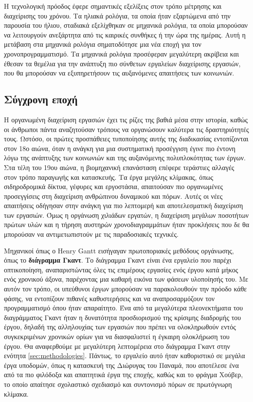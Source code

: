             Η τεχνολογική πρόοδος έφερε σημαντικές εξελίξεις στον τρόπο μέτρησης και διαχείρισης του χρόνου. Τα ηλιακά ρολόγια, τα οποία ήταν εξαρτώμενα από την παρουσία του ήλιου, σταδιακά εξελίχθηκαν σε μηχανικά ρολόγια, τα οποία μπορούσαν να λειτουργούν ανεξάρτητα από τις καιρικές συνθήκες ή την ώρα της ημέρας. Αυτή η μετάβαση στα μηχανικά ρολόγια σηματοδότησε μια νέα εποχή για τον χρονοπρογραμματισμό. Τα μηχανικά ρολόγια προσέφεραν μεγαλύτερη ακρίβεια και έθεσαν τα θεμέλια για την ανάπτυξη πιο σύνθετων εργαλείων διαχείρισης εργασιών, που θα μπορούσαν να εξυπηρετήσουν τις αυξανόμενες απαιτήσεις των κοινωνιών.

        \subsection{Σύγχρονη εποχή}
            Η οργανωμένη διαχείριση εργασιών έχει τις ρίζες της βαθιά μέσα στην ιστορία, καθώς οι άνθρωποι πάντα αναζητούσαν τρόπους να οργανώσουν καλύτερα τις δραστηριότητές τους. Ωστόσο, οι πρώτες προσπάθειες τυποποίησης αυτής της διαδικασίας εντοπίζονται στον 18ο αιώνα, όταν η ανάγκη για μια συστηματική προσέγγιση έγινε πιο έντονη λόγω της ανάπτυξης των κοινωνιών και της αυξανόμενης πολυπλοκότητας των έργων. Στα τέλη του 19ου αιώνα, η βιομηχανική επανάσταση επέφερε τεράστιες αλλαγές στον τρόπο παραγωγής και κατασκευής. Τα έργα μεγάλης κλίμακας, όπως σιδηροδρομικά δίκτυα, γέφυρες και εργοστάσια, απαιτούσαν πιο οργανωμένες προσεγγίσεις στη διαχείριση ανθρώπινου δυναμικού και πόρων. Αυτές οι νέες απαιτήσεις οδήγησαν στην ανάγκη για πιο λεπτομερή και αποτελεσματική διαχείριση των εργασιών. Όμως η οργάνωση χιλιάδων εργατών, η διαχείριση μεγάλων ποσοτήτων πρώτων υλών και η τήρηση αυστηρών χρονοδιαγραμμάτων ήταν προκλήσεις που δε θα μπορούσαν να αντιμετωπιστούν με τις παραδοσιακές τεχνικές.

            Μηχανικοί όπως ο Henry Gantt εισήγαγαν πρωτοποριακές μεθόδους οργάνωσης, όπως το \textbf{διάγραμμα Γκαντ}. Το διάγραμμα Γκαντ είναι ένα εργαλείο που παρέχι οπτικοποίηση, αναπαριστώντας όλες τις επιμέρους εργασίες ενός έργου κατά μήκος ενός χρονικού άξονα, παρέχοντας μια καθαρή εικόνα των φάσεων υλοποίησής του. Με αυτόν τον τρόπο, οι υπεύθυνοι έργων μπορούσαν να παρακολουθούν την πρόοδο κάθε φάσης, να εντοπίζουν πιθανές καθυστερήσεις και να αναπροσαρμόζουν τον προγραμματισμό όπου ήταν απαραίτητο. Ένα από τα μεγαλύτερα πλεονεκτήματα του διαγράμματος Γκαντ ήταν η δυνατότητα προσδιορισμού της κρίσιμης διαδρομής του έργου, δηλαδή της αλληλουχίας των εργασιών που πρέπει να ολοκληρωθούν εντός συγκεκριμένων χρονικών ορίων για να διασφαλιστεί η έγκαιρη ολοκλήρωση του έργου. Θα αναφερθούμε με μεγαλύτερη λεπτομέρεια στο διάγραμμα Γκαντ στην ενότητα \ref{sec:methodologies}. Πάντως, το εργαλείο αυτό ήταν καθοριστικό σε μεγάλα έργα υποδομών, όπως η κατασκευή της Διώρυγας του Παναμά, που αποτέλεσε ένα από τα πιο φιλόδοξα και απαιτητικά έργα της εποχής, καθώς και το φράγμα Χούβερ, το οποίο απαίτησε σχολαστικό σχεδιασμό και συντονισμό πόρων σε πρωτόγνωρη κλίμακα. \cite{strefapmiHooverGreatest}


